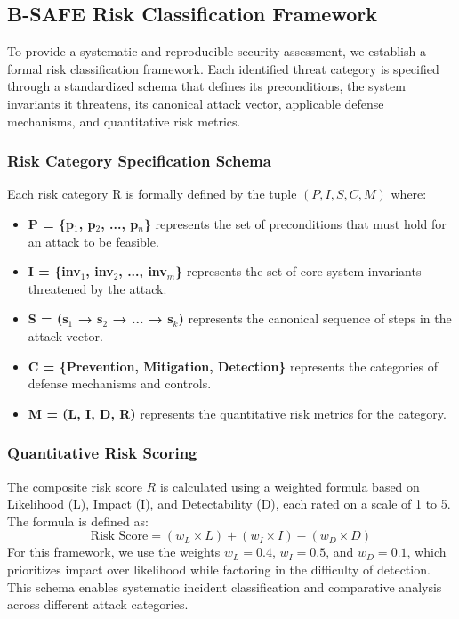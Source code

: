 \subsection{B-SAFE Risk Classification Framework}
\label{sec:methodology_risk_framework}
To provide a systematic and reproducible security assessment, we establish a formal risk classification framework. Each identified threat category is specified through a standardized schema that defines its preconditions, the system invariants it threatens, its canonical attack vector, applicable defense mechanisms, and quantitative risk metrics.

\subsubsection{Risk Category Specification Schema}
Each risk category R is formally defined by the tuple \( (P, I, S, C, M) \) where:
\begin{itemize}
    \item \textbf{P = \{p$_1$, p$_2$, ..., p$_n$\}} represents the set of preconditions that must hold for an attack to be feasible.
    \item \textbf{I = \{inv$_1$, inv$_2$, ..., inv$_m$\}} represents the set of core system invariants threatened by the attack.
    \item \textbf{S = (s$_1$ → s$_2$ → ... → s$_k$)} represents the canonical sequence of steps in the attack vector.
    \item \textbf{C = \{Prevention, Mitigation, Detection\}} represents the categories of defense mechanisms and controls.
    \item \textbf{M = (L, I, D, R)} represents the quantitative risk metrics for the category.
\end{itemize}

\subsubsection{Quantitative Risk Scoring}
The composite risk score \( R \) is calculated using a weighted formula based on Likelihood (L), Impact (I), and Detectability (D), each rated on a scale of 1 to 5. The formula is defined as:
\begin{equation}
    \text{Risk Score} = (w_L \times L) + (w_I \times I) - (w_D \times D)
\end{equation}
For this framework, we use the weights \(w_L=0.4\), \(w_I=0.5\), and \(w_D=0.1\), which prioritizes impact over likelihood while factoring in the difficulty of detection. This schema enables systematic incident classification and comparative analysis across different attack categories.
